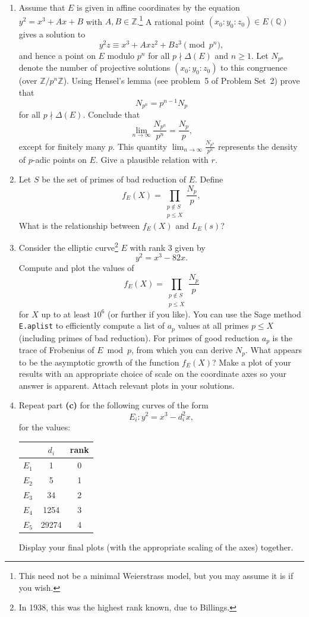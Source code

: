 \documentclass[11pt]{article}
\newcommand{\Q}{\mathbb{Q}}
\newcommand{\Z}{\mathbb{Z}}
\newcommand{\p}{\mathfrak{p}}
\theoremstyle{definition}
\begin{document}
\begin{enumerate}[{\bf(a)}]

\item Assume that $E$ is given in affine coordinates by the equation $y^2 = x^3 + Ax + B$ with $A, B \in \Z$.\footnote{This need not be a minimal Weierstrass model, but you may assume it is if you wish.}  A rational point $(x_0:y_0:z_0)\in E(\Q)$ gives a solution to
\[y^2z \equiv x^3 + Axz^2 +Bz^3 \pmod{p^n}, \]
and hence a point on $E$ modulo $p^n$ for all $p\nmid \Delta(E)$ and $n\ge 1$.  Let $N_{p^n}$ denote the number of projective solutions $(x_0:y_0:z_0)$ to this congruence (over $\Z/p^n\Z$).  Using Hensel's lemma (see problem~5 of Problem Set~2) prove that 
\[N_{p^n} = p^{n-1}N_p \]
for all $p \nmid \Delta(E)$.  Conclude that
\[ \lim_{n \to \infty} \frac{N_{p^n}}{p^{n}} = \frac{N_p}{p},\]
except for finitely many $p$.  This quantity $\lim_{n \to \infty} \frac{N_{p^n}}{p^{n}}$ represents the density of $p$-adic points on $E$.  Give a plausible relation with $r$.  

\item Let $S$ be the set of primes of bad reduction of $E$.  Define
\[f_E(X) = \prod_{\substack{p \not\in S\\p \leq X}} \frac{N_p}{p}, \]
What is the relationship between $f_E(X)$ and $L_E(s)$?

\item Consider the elliptic curve\footnote{In 1938, this was the highest rank known, due to Billings.} $E$ with rank $3$ given by
\[ y^2 = x^3 - 82x.\]
Compute and plot the values of 
\[f_E(X) = \prod_{\substack{p \not\in S \\ p\leq X}} \frac{N_p}{p} \]
for $X$ up to at least $10^6$ (or further if you like).  You can use the Sage method \texttt{E.aplist} to efficiently compute a list of $a_p$ values at all primes $p\le X$ (including primes of bad reduction).  For primes of good reduction $a_p$ is the trace of Frobenius of $E\bmod p$, from which you can derive $N_p$.
What appears to be the asymptotic growth of the function $f_E(X)$?
Make a plot of your results with an appropriate choice of scale on the coordinate axes so your answer is apparent.
Attach relevant plots in your solutions.

\item Repeat part \textbf{(c)} for the following curves of the form
\[E_i : y^2 = x^3 - d_i^2 x,\]
for the values:
\begin{center}
\begin{tabular}{c | c | c}
 & $d_i$ & rank \\ \hline \hline
$E_1$ & 1 & 0 \\
$E_2$ & 5 & 1\\
$E_3$ & 34 & 2\\
$E_4$ & 1254 & 3 \\
$E_5$ & 29274 & 4\\
\end{tabular}
\end{center}
Display your final plots (with the appropriate scaling of the axes) together.


\end{enumerate}
\end{document}
